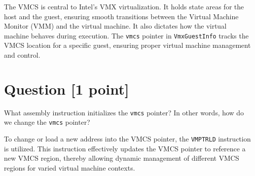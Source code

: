 \documentclass[11pt]{article}
\begin{document}
\begin{solution}
The VMCS is central to Intel's VMX virtualization. It holds state areas for the host and the guest, ensuring smooth transitions between the Virtual Machine Monitor (VMM) and the virtual machine. It also dictates how the virtual machine behaves during execution. The \texttt{vmcs} pointer in \texttt{VmxGuestInfo} tracks the VMCS location for a specific guest, ensuring proper virtual machine management and control.

\end{solution}


\section{Question [1 point]}

What assembly instruction initializes the \texttt{vmcs} pointer? In other words, how do we change the \texttt{vmcs} pointer?

\begin{solution}

To change or load a new address into the VMCS pointer, the \texttt{VMPTRLD} instruction is utilized. This instruction effectively updates the VMCS pointer to reference a new VMCS region, thereby allowing dynamic management of different VMCS regions for varied virtual machine contexts.

\end{solution}
\end{document}
